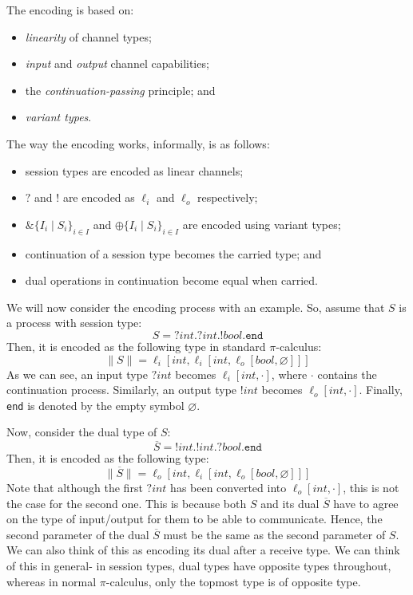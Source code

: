 \documentclass[a4paper, openany]{memoir}
\theoremstyle{definition}
\begin{document}
    The encoding is based on:
    \begin{itemize}
        \item \emph{linearity} of channel types;
        \item \emph{input} and \emph{output} channel capabilities;
        \item the \emph{continuation-passing} principle; and
        \item \emph{variant types}.
    \end{itemize}
    The way the encoding works, informally, is as follows:
    \begin{itemize}
        \item session types are encoded as linear channels;
        \item $?$ and $!$ are encoded as $\ell_i$ and $\ell_o$ respectively;
        \item $\& \{I_i \mid S_i\}_{i \in I}$ and $\oplus \{I_i \mid S_i\}_{i \in I}$ are encoded using variant types;
        \item continuation of a session type becomes the carried type; and
        \item dual operations in continuation become equal when carried.
    \end{itemize}
    
    We will now consider the encoding process with an example. So, assume that $S$ is a process with session type:
    \[S = ?\textit{int}.?\textit{int}.!\textit{bool}.\texttt{end}\]
    Then, it is encoded as the following type in standard $\pi$-calculus:
    \[\lVert S \rVert = \ell_i[\textit{int}, \ell_i[\textit{int}, \ell_o [\textit{bool}, \varnothing]]]\]
    As we can see, an input type $?\textit{int}$ becomes $\ell_i[\textit{int}, \cdot]$, where $\cdot$ contains the continuation process. Similarly, an output type $!\textit{int}$ becomes $\ell_o[\textit{int}, \cdot]$. Finally, \texttt{end} is denoted by the empty symbol $\varnothing$.

    Now, consider the dual type of $S$:
    \[\overline{S} = !\textit{int}.!\textit{int}.?\textit{bool}.\texttt{end}\]
    Then, it is encoded as the following type:
    \[\lVert \overline{S} \rVert = \ell_o[\textit{int}, \ell_i[\textit{int}, \ell_o[\textit{bool}, \varnothing]]]\]
    Note that although the first $?\textit{int}$ has been converted into $\ell_o[\textit{int}, \cdot]$, this is not the case for the second one. This is because both $S$ and its dual $\overline{S}$ have to agree on the type of input/output for them to be able to communicate. Hence, the second parameter of the dual $\overline{S}$ must be the same as the second parameter of $S$. We can also think of this as encoding its dual after a receive type. We can think of this in general- in session types, dual types have opposite types throughout, whereas in normal $\pi$-calculus, only the topmost type is of opposite type.
\end{document}
